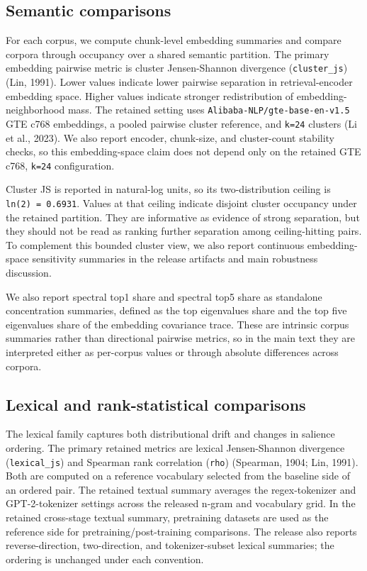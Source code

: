 \documentclass[11pt]{article}
\begin{document}
\subsection{Semantic comparisons}\label{semantic-comparisons}

For each corpus, we compute chunk-level embedding summaries and compare corpora through occupancy over a shared semantic partition. The primary embedding pairwise metric is cluster Jensen-Shannon divergence (\texttt{cluster\_js}) (Lin, 1991). Lower values indicate lower pairwise separation in retrieval-encoder embedding space. Higher values indicate stronger redistribution of embedding-neighborhood mass. The retained setting uses \texttt{Alibaba-NLP/gte-base-en-v1.5} GTE c768 embeddings, a pooled pairwise cluster reference, and \texttt{k=24} clusters (Li et al., 2023). We also report encoder, chunk-size, and cluster-count stability checks, so this embedding-space claim does not depend only on the retained GTE c768, \texttt{k=24} configuration.

Cluster JS is reported in natural-log units, so its two-distribution ceiling is \texttt{ln(2)\ =\ 0.6931}. Values at that ceiling indicate disjoint cluster occupancy under the retained partition. They are informative as evidence of strong separation, but they should not be read as ranking further separation among ceiling-hitting pairs. To complement this bounded cluster view, we also report continuous embedding-space sensitivity summaries in the release artifacts and main robustness discussion.

We also report spectral top1 share and spectral top5 share as standalone concentration summaries, defined as the top eigenvalue\textquotesingle s share and the top five eigenvalues\textquotesingle{} share of the embedding covariance trace. These are intrinsic corpus summaries rather than directional pairwise metrics, so in the main text they are interpreted either as per-corpus values or through absolute differences across corpora.

\subsection{Lexical and rank-statistical comparisons}\label{lexical-and-rank-statistical-comparisons}

The lexical family captures both distributional drift and changes in salience ordering. The primary retained metrics are lexical Jensen-Shannon divergence (\texttt{lexical\_js}) and Spearman rank correlation (\texttt{rho}) (Spearman, 1904; Lin, 1991). Both are computed on a reference vocabulary selected from the baseline side of an ordered pair. The retained textual summary averages the regex-tokenizer and GPT-2-tokenizer settings across the released n-gram and vocabulary grid. In the retained cross-stage textual summary, pretraining datasets are used as the reference side for pretraining/post-training comparisons. The release also reports reverse-direction, two-direction, and tokenizer-subset lexical summaries; the ordering is unchanged under each convention.
\end{document}
